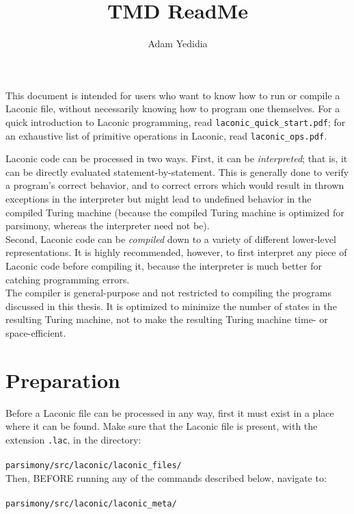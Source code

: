 \documentclass[11pt]{article}
\title{TMD ReadMe}
\author{Adam Yedidia}
\begin{document}
    
\maketitle

This document is intended for users who want to know how to run or compile a Laconic file, without necessarily knowing how to program one themselves. For a quick introduction to Laconic programming, read \texttt{laconic_quick_start.pdf}; for an exhaustive list of primitive operations in Laconic, read \texttt{laconic_ops.pdf}.

Laconic code can be processed in two ways. First, it can be \emph{interpreted}; that is, it can be directly evaluated statement-by-statement. This is generally done to verify a program's correct behavior, and to correct errors which would result in thrown exceptions in the interpreter but might lead to undefined behavior in the compiled Turing machine (because the compiled Turing machine is optimized for parsimony, whereas the interpreter need not be). \\

Second, Laconic code can be \emph{compiled} down to a variety of different lower-level representations. It is highly recommended, however, to first interpret any piece of Laconic code before compiling it, because the interpreter is much better for catching programming errors. \\

The compiler is general-purpose and not restricted to compiling the programs discussed in this thesis. It is optimized to minimize the number of states in the resulting Turing machine, not to make the resulting Turing machine time- or space-efficient. \\

\section{Preparation}

Before a Laconic file can be processed in any way, first it must exist in a place where it can be found. Make sure that the Laconic file is present, with the extension \texttt{.lac}, in the directory: \\ \\
\texttt{parsimony/src/laconic/laconic_files/} \\ 

Then, BEFORE running any of the commands described below, navigate to: \\ \\
\texttt{parsimony/src/laconic/laconic_meta/}
\end{document}
